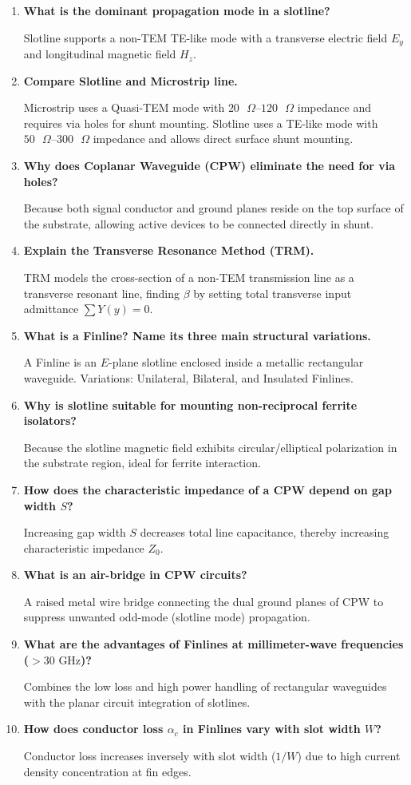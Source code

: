 \documentclass[12pt,a4paper]{article}
\newcommand{\Q}[1]{\textbf{#1}\par\noindent\ignorespaces}
\begin{document}
\begin{tcolorbox}[exambox, title={\textbf{Frequently Asked / Viva Questions}}]
  \begin{enumerate}[topsep=0pt, label=\textbf{Q\arabic*.}, itemsep=5pt]
    \item \Q{What is the dominant propagation mode in a slotline?}
    Slotline supports a non-TEM TE-like mode with a transverse electric field $E_y$ and longitudinal magnetic field $H_z$.

    \item \Q{Compare Slotline and Microstrip line.}
    Microstrip uses a Quasi-TEM mode with $20\text{ }\Omega$--$120\text{ }\Omega$ impedance and requires via holes for shunt mounting. Slotline uses a TE-like mode with $50\text{ }\Omega$--$300\text{ }\Omega$ impedance and allows direct surface shunt mounting.

    \item \Q{Why does Coplanar Waveguide (CPW) eliminate the need for via holes?}
    Because both signal conductor and ground planes reside on the top surface of the substrate, allowing active devices to be connected directly in shunt.

    \item \Q{Explain the Transverse Resonance Method (TRM).}
    TRM models the cross-section of a non-TEM transmission line as a transverse resonant line, finding $\beta$ by setting total transverse input admittance $\sum Y(y) = 0$.

    \item \Q{What is a Finline? Name its three main structural variations.}
    A Finline is an $E$-plane slotline enclosed inside a metallic rectangular waveguide. Variations: Unilateral, Bilateral, and Insulated Finlines.

    \item \Q{Why is slotline suitable for mounting non-reciprocal ferrite isolators?}
    Because the slotline magnetic field exhibits circular/elliptical polarization in the substrate region, ideal for ferrite interaction.

    \item \Q{How does the characteristic impedance of a CPW depend on gap width $S$?}
    Increasing gap width $S$ decreases total line capacitance, thereby increasing characteristic impedance $Z_0$.

    \item \Q{What is an air-bridge in CPW circuits?}
    A raised metal wire bridge connecting the dual ground planes of CPW to suppress unwanted odd-mode (slotline mode) propagation.

    \item \Q{What are the advantages of Finlines at millimeter-wave frequencies ($>30\text{ GHz}$)?}
    Combines the low loss and high power handling of rectangular waveguides with the planar circuit integration of slotlines.

    \item \Q{How does conductor loss $\alpha_c$ in Finlines vary with slot width $W$?}
    Conductor loss increases inversely with slot width ($1/W$) due to high current density concentration at fin edges.
  \end{enumerate}
\end{tcolorbox}
\end{document}
